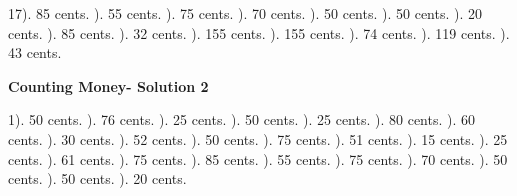 \documentclass{article}%
\begin{document}
17). 85 cents.%
). 55 cents.%
). 75 cents.%
). 70 cents.%
). 50 cents.%
). 50 cents.%
). 20 cents.%
). 85 cents.%
). 32 cents.%
). 155 cents.%
). 155 cents.%
). 74 cents.%
). 119 cents.%
). 43 cents.%
\newline%
\newpage%
\large%
\begin{center}%
\textbf{Counting Money- Solution 2}%
\newline%
\end{center} \normalsize%
1). 50 cents.%
). 76 cents.%
). 25 cents.%
). 50 cents.%
). 25 cents.%
). 80 cents.%
). 60 cents.%
). 30 cents.%
). 52 cents.%
). 50 cents.%
). 75 cents.%
). 51 cents.%
). 15 cents.%
). 25 cents.%
). 61 cents.%
). 75 cents.%
). 85 cents.%
). 55 cents.%
). 75 cents.%
). 70 cents.%
). 50 cents.%
). 50 cents.%
). 20 cents.%
\end{document}

